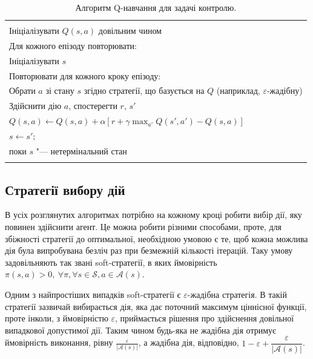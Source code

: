 \begin{table}
\centering
\begin{tabular}{|l|}
\hline\\
Ініціалізувати $Q(s,a)$ довільним чином\\
Для кожного епізоду повторювати:\\
\hspace{0.5cm} Ініціалізувати $s$\\
\hspace{0.5cm} Повторювати для кожного кроку епізоду:\\
\hspace{1cm} Обрати $a$ зі стану $s$ згідно стратегії, що базується на $Q$ (наприклад, $\varepsilon$-жадібну)\\
\hspace{1cm} 	Здійснити дію $a$, спостерегти $r$, $s'$\\
\hspace{1cm} 	$Q(s,a) \leftarrow Q(s,a) + \alpha\left[r + \gamma \max_{a'}Q(s',a') - Q(s,a)\right]$\\
\hspace{1cm} 	$s \leftarrow s';$\\
\hspace{0.5cm} поки $s$ "--- нетермінальний стан\\
\\
\hline
\end{tabular}
\caption{Алгоритм Q-навчання для задачі контролю.}
\label{Q_algorithm}
\end{table}

\subsection{Стратегії вибору дій}
В усіх розглянутих алгоритмах потрібно на кожному кроці робити вибір дії, яку повинен здійснити агент. Це можна робити різними способами, проте, для збіжності стратегії до оптимальної, необхідною умовою є те, щоб кожна можлива дія була випробувана безліч раз при безмежній кількості ітерацій. Таку умову задовільняють так звані soft-стратегії, в яких ймовірність $\pi(s,a)>0,\ \forall \pi, \forall s \in \mathcal{S}, a \in \mathcal{A}(s)$.

Одним з найпростіших випадків soft-стратегії є $\varepsilon$-жадібна стратегія. В такій стратегії зазвичай вибирається дія, яка дає поточний максимум ціннісної функції, проте інколи, з ймовірністю $\varepsilon$, приймається рішення про здійснення довільної випадкової допустимої дії. Таким чином будь-яка не жадібна дія отримує ймовірність виконання, рівну $\frac{\varepsilon}{|\mathcal{A}(s)|}$, а жадібна дія, відповідно, $ 1 - \varepsilon + \dfrac{\varepsilon}{|\mathcal{A}(s)|}$.

